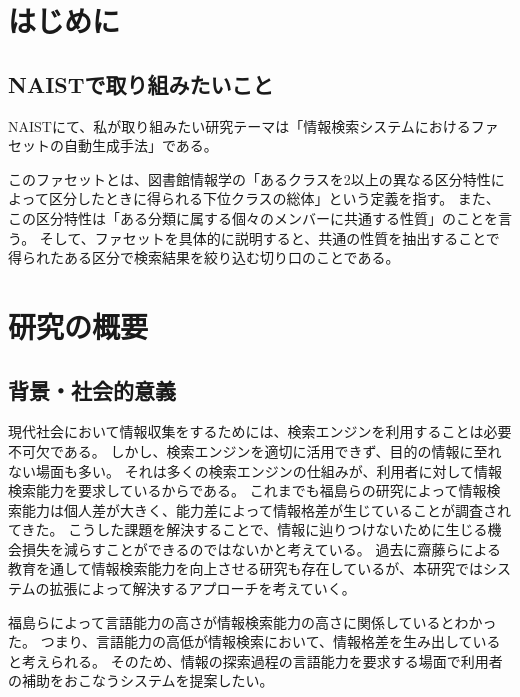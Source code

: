 \documentclass[a4j,10pt, twocolumn]{jarticle} \usepackage[dvipdfmx]{graphicx} \usepackage{amssymb} \usepackage{amsmath}
\begin{document}


\section{はじめに}
\subsection{NAISTで取り組みたいこと}
NAISTにて、私が取り組みたい研究テーマは「情報検索システムにおけるファセットの自動生成手法」である。

このファセットとは、図書館情報学の「あるクラスを2以上の異なる区分特性によって区分したときに得られる下位クラスの総体\cite{libdic}」という定義を指す。
また、この区分特性は「ある分類に属する個々のメンバーに共通する性質」のことを言う。
そして、ファセットを具体的に説明すると、共通の性質を抽出することで得られたある区分で検索結果を絞り込む切り口のことである。
\section{研究の概要}
\subsection{背景・社会的意義}
 現代社会において情報収集をするためには、検索エンジンを利用することは必要不可欠である。
 しかし、検索エンジンを適切に活用できず、目的の情報に至れない場面も多い。
 それは多くの検索エンジンの仕組みが、利用者に対して情報検索能力を要求しているからである。
 これまでも福島らの研究によって情報検索能力は個人差が大きく、能力差によって情報格差が生じていることが調査されてきた\cite{fukushima}。
 こうした課題を解決することで、情報に辿りつけないために生じる機会損失を減らすことができるのではないかと考えている。
 過去に齋藤らによる教育を通して情報検索能力を向上させる研究\cite{saito}も存在しているが、本研究ではシステムの拡張によって解決するアプローチを考えていく。

 福島らによって言語能力の高さが情報検索能力の高さに関係しているとわかった\cite{fukushima}。
 つまり、言語能力の高低が情報検索において、情報格差を生み出していると考えられる。
 そのため、情報の探索過程の言語能力を要求する場面で利用者の補助をおこなうシステムを提案したい。
\end{document}
